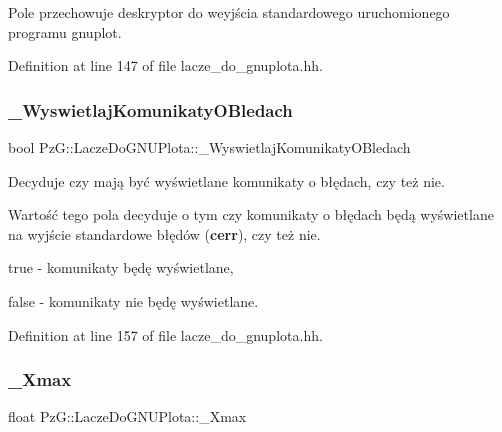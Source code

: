 Pole przechowuje deskryptor do weyjścia standardowego uruchomionego programu gnuplot. 

Definition at line 147 of file lacze\+\_\+do\+\_\+gnuplota.\+hh.

\mbox{\label{class_pz_g_1_1_lacze_do_g_n_u_plota_a2f2800f14ebfe1caef0b4d30c410a7fe}} 
\subsubsection{\texorpdfstring{\+\_\+\+Wyswietlaj\+Komunikaty\+O\+Bledach}{\_WyswietlajKomunikatyOBledach}}
{\footnotesize\ttfamily bool Pz\+G\+::\+Lacze\+Do\+G\+N\+U\+Plota\+::\+\_\+\+Wyswietlaj\+Komunikaty\+O\+Bledach\hspace{0.3cm}{\ttfamily [protected]}}



Decyduje czy mają być wyświetlane komunikaty o błędach, czy też nie. 

Wartość tego pola decyduje o tym czy komunikaty o błędach będą wyświetlane na wyjście standardowe błędów ({\bfseries cerr}), czy też nie. \begin{DoxyItemize}
\item {\ttfamily true} -\/ komunikaty będę wyświetlane, \item {\ttfamily false} -\/ komunikaty nie będę wyświetlane. \end{DoxyItemize}


Definition at line 157 of file lacze\+\_\+do\+\_\+gnuplota.\+hh.

\mbox{\label{class_pz_g_1_1_lacze_do_g_n_u_plota_a847e00678a413ab076ccbcb7eba3ae58}} 
\subsubsection{\texorpdfstring{\+\_\+\+Xmax}{\_Xmax}}
{\footnotesize\ttfamily float Pz\+G\+::\+Lacze\+Do\+G\+N\+U\+Plota\+::\+\_\+\+Xmax\hspace{0.3cm}{\ttfamily [protected]}}



